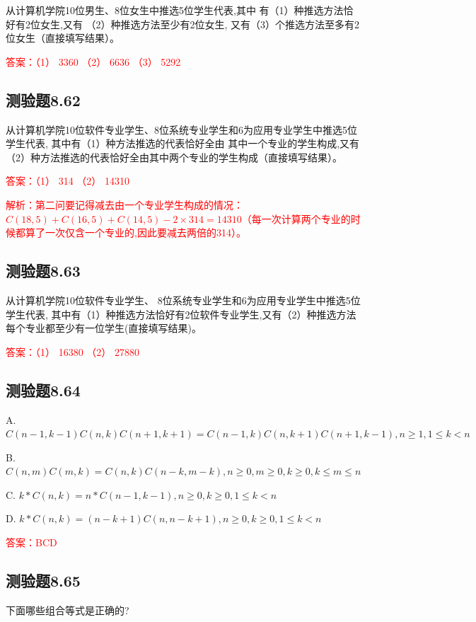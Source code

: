 \documentclass[UTF8, heading=true]{ctexart}
\begin{document}
从计算机学院10位男生、8位女生中推选5位学生代表,其中
有（1）种推选方法恰好有2位女生,又有
（2）种推选方法至少有2位女生,
又有（3）个推选方法至多有2位女生（直接填写结果）。

\textcolor{red}{答案：（1） 3360 （2） 6636 （3） 5292}

\subsection{测验题8.62}
从计算机学院10位软件专业学生、8位系统专业学生和6为应用专业学生中推选5位学生代表,
其中有（1）种方法推选的代表恰好全由
其中一个专业的学生构成,又有（2）种方法推选的代表恰好全由其中两个专业的学生构成（直接填写结果）。

\textcolor{red}{答案：（1） 314 （2） 14310}

\textcolor{red}{解析：第二问要记得减去由一个专业学生构成的情况：$C(18,5)+C(16,5)+C(14,5)-2\times 314 = 14310$（每一次计算两个专业的时候都算了一次仅含一个专业的,因此要减去两倍的314）。}

\subsection{测验题8.63}
从计算机学院10位软件专业学生、
8位系统专业学生和6为应用专业学生中推选5位学生代表,
其中有（1）种推选方法恰好有2位软件专业学生,又有（2）种推选方法每个专业都至少有一位学生(直接填写结果)。

\textcolor{red}{答案：（1） 16380 （2） 27880}


\subsection{测验题8.64}

A. $C(n-1, k-1) C(n, k) C(n+1, k+1)=C(n-1, k) C(n, k+1) C(n+1, k-1), n \geq 1,1 \leq k<n$

B. $ C(n, m) C(m, k)=C(n, k) C(n-k, m-k), n \geq 0, m \geq 0, k \geq 0, k \leq m \leq n$

C. $ k * C(n, k)=n * C(n-1, k-1),  n \geq 0, k \geq 0,1 \leq k<n$

D. $ k * C(n, k)=(n-k+1) C(n, n-k+1), n \geq 0, k \geq 0,1 \leq k<n$

\textcolor{red}{答案：BCD}

\subsection{测验题8.65}

下面哪些组合等式是正确的?
\end{document}
